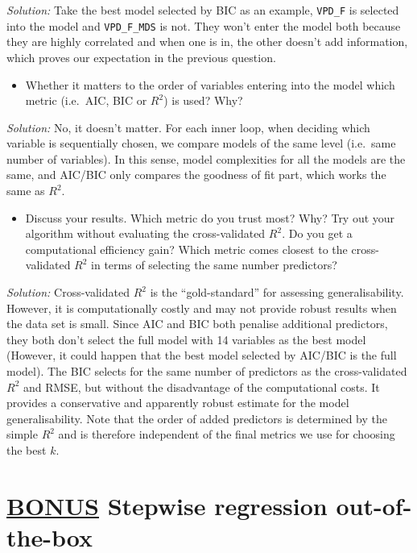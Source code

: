 \documentclass[
]{book}
\providecommand{\tightlist}{%
  \setlength{\itemsep}{0pt}\setlength{\parskip}{0pt}}
\begin{document}
\emph{Solution:}
Take the best model selected by BIC as an example, \texttt{VPD\_F} is selected into the model and \texttt{VPD\_F\_MDS} is not. They won't enter the model both because they are highly correlated and when one is in, the other doesn't add information, which proves our expectation in the previous question.

\begin{itemize}
\tightlist
\item
  Whether it matters to the order of variables entering into the model which metric (i.e.~AIC, BIC or \(R^2\)) is used? Why?
\end{itemize}

\emph{Solution:}
No, it doesn't matter. For each inner loop, when deciding which variable is sequentially chosen, we compare models of the same level (i.e.~same number of variables). In this sense, model complexities for all the models are the same, and AIC/BIC only compares the goodness of fit part, which works the same as \(R^2\).

\begin{itemize}
\tightlist
\item
  Discuss your results. Which metric do you trust most? Why? Try out your algorithm without evaluating the cross-validated \(R^2\). Do you get a computational efficiency gain? Which metric comes closest to the cross-validated \(R^2\) in terms of selecting the same number predictors?
\end{itemize}

\emph{Solution:}
Cross-validated \(R^2\) is the ``gold-standard'' for assessing generalisability. However, it is computationally costly and may not provide robust results when the data set is small. Since AIC and BIC both penalise additional predictors, they both don't select the full model with 14 variables as the best model (However, it could happen that the best model selected by AIC/BIC is the full model). The BIC selects for the same number of predictors as the cross-validated \(R^2\) and RMSE, but without the disadvantage of the computational costs. It provides a conservative and apparently robust estimate for the model generalisability. Note that the order of added predictors is determined by the simple \(R^2\) and is therefore independent of the final metrics we use for choosing the best \(k\).

\hypertarget{bonus-stepwise-regression-out-of-the-box-1}{%
\section{\texorpdfstring{\protect\hyperlink{bonus}{BONUS} Stepwise regression out-of-the-box}{BONUS Stepwise regression out-of-the-box}}\label{bonus-stepwise-regression-out-of-the-box-1}}
\end{document}
